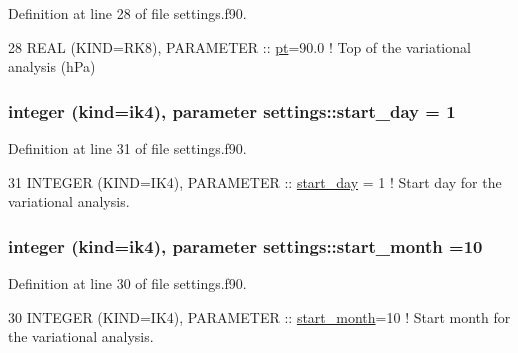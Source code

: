 Definition at line 28 of file settings.\+f90.


\begin{DoxyCode}
28 \textcolor{keywordtype}{REAL (KIND=RK8)}, \textcolor{keywordtype}{PARAMETER}      :: \hyperlink{namespacesettings_ac94cc887999dc993bb580baf0ce85ce3}{pt}=90.0                  \textcolor{comment}{! Top of the variational analysis (hPa)}
\end{DoxyCode}
\subsubsection[{\texorpdfstring{start\+\_\+day}{start_day}}]{\setlength{\rightskip}{0pt plus 5cm}integer (kind=ik4), parameter settings\+::start\+\_\+day = 1}\hypertarget{namespacesettings_a9d8f79c61533111bb5efd5ee1577108f}{}\label{namespacesettings_a9d8f79c61533111bb5efd5ee1577108f}


Definition at line 31 of file settings.\+f90.


\begin{DoxyCode}
31 \textcolor{keywordtype}{INTEGER (KIND=IK4)}, \textcolor{keywordtype}{PARAMETER}   :: \hyperlink{namespacesettings_a9d8f79c61533111bb5efd5ee1577108f}{start\_day} = 1          \textcolor{comment}{! Start day for the variational
       analysis.}
\end{DoxyCode}
\subsubsection[{\texorpdfstring{start\+\_\+month}{start_month}}]{\setlength{\rightskip}{0pt plus 5cm}integer (kind=ik4), parameter settings\+::start\+\_\+month =10}\hypertarget{namespacesettings_a10988f9d662713f7f29e611c9b6c873d}{}\label{namespacesettings_a10988f9d662713f7f29e611c9b6c873d}


Definition at line 30 of file settings.\+f90.


\begin{DoxyCode}
30 \textcolor{keywordtype}{INTEGER (KIND=IK4)}, \textcolor{keywordtype}{PARAMETER}   :: \hyperlink{namespacesettings_a10988f9d662713f7f29e611c9b6c873d}{start\_month}=10          \textcolor{comment}{! Start month for the variational
       analysis.}
\end{DoxyCode}
